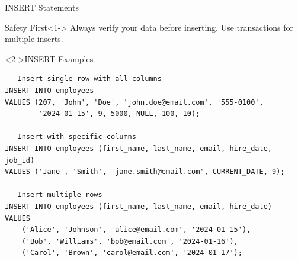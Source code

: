 \documentclass[aspectratio=169,11pt]{beamer}
\begin{document}
\begin{frame}[fragile]{INSERT Statements}
\begin{alertblock}{\textcolor{red}{} Safety First}<1->
Always verify your data before inserting. Use transactions for multiple inserts.
\end{alertblock}

\pause
\begin{exampleblock}<2->{INSERT Examples}
\begin{lstlisting}
-- Insert single row with all columns
INSERT INTO employees 
VALUES (207, 'John', 'Doe', 'john.doe@email.com', '555-0100', 
        '2024-01-15', 9, 5000, NULL, 100, 10);

-- Insert with specific columns
INSERT INTO employees (first_name, last_name, email, hire_date, job_id)
VALUES ('Jane', 'Smith', 'jane.smith@email.com', CURRENT_DATE, 9);

-- Insert multiple rows
INSERT INTO employees (first_name, last_name, email, hire_date)
VALUES 
    ('Alice', 'Johnson', 'alice@email.com', '2024-01-15'),
    ('Bob', 'Williams', 'bob@email.com', '2024-01-16'),
    ('Carol', 'Brown', 'carol@email.com', '2024-01-17');
\end{lstlisting}
\end{exampleblock}
\end{frame}
\end{document}
